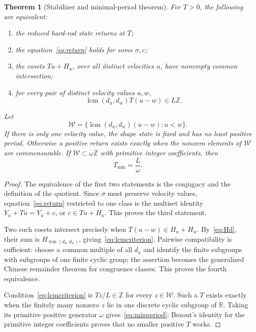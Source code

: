 \documentclass[10pt]{article}
\newtheorem{theorem}{Theorem}
\newcommand{\R}{\mathbb R}
\newcommand{\Z}{\mathbb Z}
\newcommand{\lcm}{\operatorname{lcm}}
\begin{document}
\begin{theorem}[Stabilizer and minimal-period theorem]\label{thm:return}
For $T>0$, the following are equivalent:
\begin{enumerate}
\item the reduced hard-rod state returns at $T$;
\item the equation~\eqref{eq:return} holds for some $\sigma,c$;
\item the cosets $Tu+H_u$, over all distinct velocities $u$, have nonempty
      common intersection;
\item for every pair of distinct velocity values $u,w$,
\begin{equation}\label{eq:lcmcriterion}
 \lcm(d_u,d_w)T(u-w)\in L\Z.
\end{equation}
\end{enumerate}
Let
\[
 \mathcal W=\{\lcm(d_u,d_w)(u-w):u<w\}.
\]
If there is only one velocity value, the shape state is fixed and has no least
positive period.  Otherwise a positive return exists exactly when the nonzero
elements of $\mathcal W$ are commensurable.  If
$\mathcal W\subset\omega\Z$ with primitive integer coefficients, then
\begin{equation}\label{eq:minperiod}
 T_{\min}=\frac L\omega.
\end{equation}
\end{theorem}
\begin{proof}
The equivalence of the first two statements is the conjugacy and the
definition of the quotient.  Since $\sigma$ must preserve velocity values,
equation~\eqref{eq:return} restricted to one class is the multiset identity
$Y_u+Tu=Y_u+c$, or $c\in Tu+H_u$.  This proves the third statement.

Two such cosets intersect precisely when
$T(u-w)\in H_u+H_w$.  By~\eqref{eq:Hd}, their sum is
$H_{\lcm(d_u,d_w)}$, giving~\eqref{eq:lcmcriterion}.  Pairwise compatibility
is sufficient: choose a common multiple of all $d_u$ and identify the finite
subgroups with subgroups of one finite cyclic group; the assertion becomes
the generalized Chinese remainder theorem for congruence classes.  This
proves the fourth equivalence.

Condition~\eqref{eq:lcmcriterion} is $Tz/L\in\Z$ for every
$z\in\mathcal W$.  Such a $T$ exists exactly when the finitely many nonzero
$z$ lie in one discrete cyclic subgroup of $\R$.  Taking its primitive
positive generator $\omega$ gives~\eqref{eq:minperiod}; Bezout's identity for
the primitive integer coefficients proves that no smaller positive $T$ works.
\end{proof}
\end{document}
